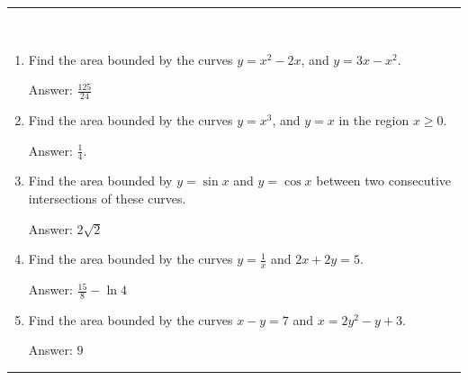 \documentclass[../calc1-main.tex]{subfiles}
\begin{document}
\rule{\textwidth}{1pt}
\begin{multicols}{2}
\begin{exercise}
~\\
  \begin{enumerate}
    \item Find the area bounded by the curves $y=x^2-2x$, and $y=3x-x^2$.

    Answer: $\frac{125}{24}$

    \item Find the area bounded by the curves $y=x^3$, and $y=x$ in the region $x \ge 0$.

    Answer: $\frac{1}{4}$.

    \item Find the area bounded by $y= \sin x$ and $y= \cos x$ between two consecutive intersections of these curves.

    Answer: $2\sqrt{2}$

    \item Find the area bounded by the curves $y=\frac{1}{x}$ and $2x+2y = 5$.

    Answer: $\frac{15}{8} - \ln4$

    \item Find the area bounded by the curves $x-y=7$ and $x=2y^2-y+3$.

    Answer: $9$
  \end{enumerate}
\end{exercise}
\end{multicols}
\rule{\textwidth}{1pt}
\end{document}
